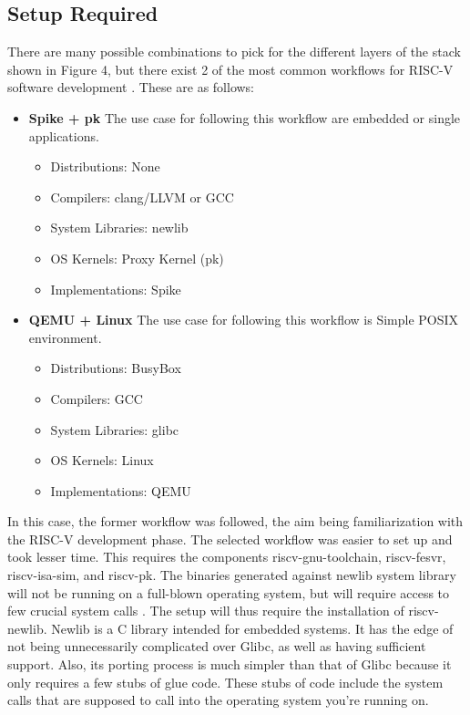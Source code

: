 \subsection{Setup Required}
 \label{sect6_2_2}
There are many possible combinations to pick for the different layers of the stack shown in Figure 4, but there exist 2 of the most common workflows for RISC-V software development \cite{riscv_tools_bootcamp}. These are as follows:
\begin{itemize}
\item \textbf{Spike + pk} \newline
The use case for following this workflow are embedded or single applications.
\begin{itemize}
\item Distributions: None
\item Compilers: clang/LLVM or GCC
\item System Libraries: newlib
\item OS Kernels: Proxy Kernel (pk)
\item Implementations: Spike
\end{itemize}	
	
\item \textbf{QEMU + Linux} \newline
The use case for following this workflow is Simple POSIX environment.
\begin{itemize}
\item Distributions: BusyBox
\item Compilers: GCC
\item System Libraries: glibc
\item OS Kernels: Linux
\item Implementations: QEMU
\end{itemize}
\end{itemize}
In this case, the former workflow was followed, the aim being familiarization with the RISC-V development phase. The selected workflow was easier to set up and took lesser time. This requires the components riscv-gnu-toolchain, riscv-fesvr, riscv-isa-sim, and riscv-pk. \newline\newline
The binaries generated against newlib system library will not be running on a full-blown operating system, but will require access to few crucial system calls \cite{riscv_soft_tools}. The setup will thus require the installation of riscv-newlib. Newlib is a C library intended for embedded systems. It has the edge of not being unnecessarily complicated over Glibc, as well as having sufficient support. Also, its porting process is much simpler than that of Glibc because it only requires a few stubs of glue code. These stubs of code include the system calls that are supposed to call into the operating system you're running on.

